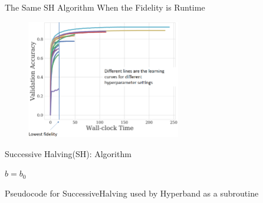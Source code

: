 
\begin{frame}{The Same SH Algorithm When the Fidelity is Runtime}
\vskip -10pt
\hskip 270pt
    
\begin{figure}
    \centering
    \includegraphics[width=0.6\textwidth]{w07_hpo_grey_box/images/hyperband/sh_accuracy_over_time.png}
\end{figure}
    
\end{frame}


\begin{frame}{Successive Halving(SH): Algorithm}
\begin{algorithm}[H]
    \LinesNumbered
    \SetAlgoLined
    \setcounter{AlgoLine}{0}
    \DeclarePairedDelimiter\ceil{\lceil}{\rceil}
    \DeclarePairedDelimiter\floor{\lfloor}{\rfloor}
    \DeclarePairedDelimiter\abs{\lvert}{\rvert}
    
    $b=b_0$\\
    
 
        
    
    \caption*{Pseudocode for SuccessiveHalving used by Hyperband as a subroutine}
\end{algorithm}

\end{frame}

